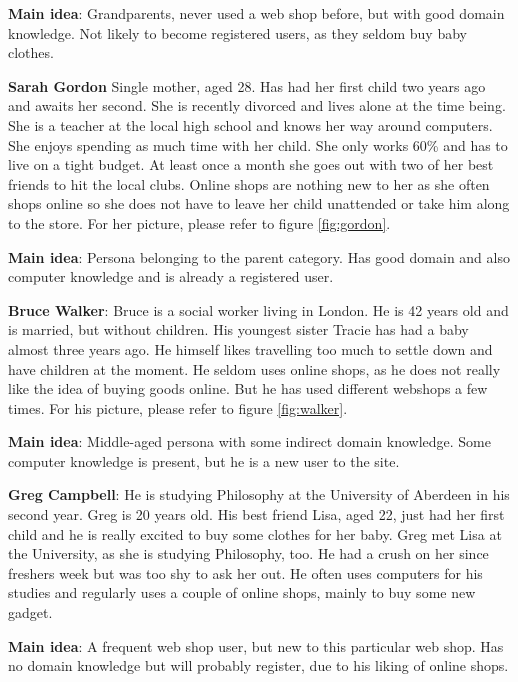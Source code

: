 \textbf{Main idea}:
Grandparents, never used a web shop before, but with good domain knowledge. Not likely to become registered users, as they seldom buy baby clothes.

\textbf{Sarah Gordon}
Single mother, aged 28. Has had her first child two years ago and awaits her second. She is recently divorced and lives alone at the time being.
She is a teacher at the local high school and knows her way around computers. 
She enjoys spending as much time with her child. She only works 60\% and has to live on a tight budget. At least once a month she goes out with two of her best friends to hit the local clubs. Online shops are nothing new to her as she often shops online so she does not have to leave her child unattended or take him along to the store.
For her picture, please refer to figure \ref{fig:gordon}.	


\textbf{Main idea}:
Persona belonging to the parent category. Has good domain and also computer knowledge and is already a registered user.

\textbf{Bruce Walker}:
Bruce is a social worker living in London. He is 42 years old and is married, but without children.
His youngest sister Tracie has had a baby almost three years ago. He himself likes travelling too much to settle down and have children at the moment.
He seldom uses online shops, as he does not really like the idea of buying goods online. But he has used different webshops a few times. For his picture, please refer to figure \ref{fig:walker}.	


\textbf{Main idea}:
Middle-aged persona with some indirect domain knowledge. Some computer knowledge is present, but he is a new user to the site.

\textbf{Greg Campbell}:
He is studying Philosophy at the University of Aberdeen in his second year. Greg is 20 years old.
His best friend Lisa, aged 22, just had her first child and he is really excited to buy some clothes for her baby.
Greg met Lisa at the University, as she is studying Philosophy, too. He had a crush on her since freshers week but was too shy to ask her out.
He often uses computers for his studies and regularly uses a couple of online shops, mainly to buy some new gadget.

\textbf{Main idea}:
A frequent web shop user, but new to this particular web shop. Has no domain knowledge but will probably register, due to his liking of online shops.
